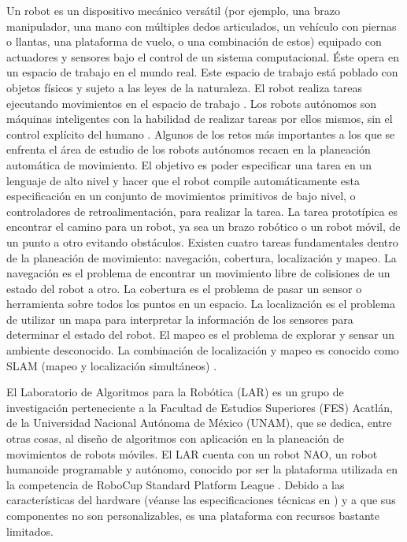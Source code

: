 Un robot es un dispositivo mecánico versátil (por ejemplo,
una brazo manipulador, una mano con múltiples dedos 
articulados, un vehículo con piernas o llantas, una
plataforma de vuelo, o una combinación de estos)
equipado con actuadores y sensores bajo el control
de un sistema computacional. 
Éste opera en un espacio de trabajo en el mundo real.
Este espacio de trabajo está poblado con objetos físicos
y sujeto a las leyes de la naturaleza.
El robot realiza tareas ejecutando movimientos en el 
espacio de trabajo \cite{latombe_1993}.
Los robots autónomos son máquinas inteligentes
con la habilidad de realizar tareas por ellos
mismos, sin el control explícito del humano \cite{bekey_2017}.
Algunos de los retos más importantes 
a los que se enfrenta el área de estudio de los
robots autónomos recaen en la planeación automática de movimiento. 
El objetivo es poder especificar una tarea en un lenguaje de alto nivel y hacer que el robot compile automáticamente esta especificación
en un conjunto de movimientos primitivos de bajo nivel, o controladores de retroalimentación, para realizar la tarea. 
La tarea prototípica es encontrar el camino 
para un robot, ya sea un brazo robótico o un robot móvil,
de un punto a otro evitando obstáculos.
Existen cuatro tareas fundamentales dentro 
de la planeación de movimiento: navegación, cobertura, localización y mapeo.
La navegación es el problema de encontrar un movimiento
libre de colisiones de un estado del robot a otro.
La cobertura es el problema de pasar un sensor o
herramienta sobre todos los puntos en un espacio.
La localización es el problema de utilizar un mapa
para interpretar la información de los sensores para
determinar el estado del robot. El mapeo es el problema de 
explorar y sensar un ambiente desconocido. La combinación
de localización y mapeo es conocido como SLAM (mapeo y localización simultáneos)  \cite{choset_2005}.

El Laboratorio de Algoritmos para la Robótica (LAR) es un 
grupo de investigación perteneciente a la Facultad de Estudios
Superiores (FES) Acatlán, de la Universidad Nacional 
Autónoma de México (UNAM), que se dedica, entre otras cosas, 
al diseño de algoritmos con aplicación en la planeación de 
movimientos de robots móviles. El LAR cuenta con un robot 
NAO, un robot humanoide programable y autónomo, conocido
por ser la plataforma utilizada en la competencia de RoboCup Standard Platform League \cite{splinfo2018}. 
Debido a las 
características del hardware (véanse las especificaciones 
técnicas en \cite{aldebaranrobotics}) y a que sus componentes 
no son personalizables, es una plataforma con recursos 
bastante limitados.


